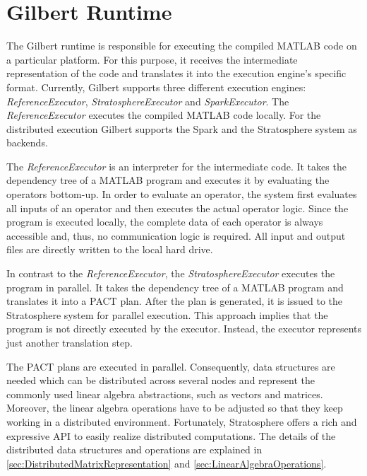 \section{Gilbert Runtime}
\label{cha:gilbertruntime}

The Gilbert runtime is responsible for executing the compiled MATLAB code on a particular platform.
For this purpose, it receives the intermediate representation of the code and translates it into the execution engine's specific format.
Currently, Gilbert supports three different execution engines: \emph{ReferenceExecutor}, \emph{StratosphereExecutor} and \emph{SparkExecutor}.
The \emph{ReferenceExecutor} executes the compiled MATLAB code locally.
For the distributed execution Gilbert supports the Spark and the Stratosphere system as backends.

The \emph{ReferenceExecutor} is an interpreter for the intermediate code.
It takes the dependency tree of a MATLAB program and executes it by evaluating the operators bottom-up.
In order to evaluate an operator, the system first evaluates all inputs of an operator and then executes the actual operator logic.
Since the program is executed locally, the complete data of each operator is always accessible and, thus, no communication logic is required.
All input and output files are directly written to the local hard drive.

In contrast to the \emph{ReferenceExecutor}, the \emph{StratosphereExecutor} executes the program in parallel.
It takes the dependency tree of a MATLAB program and translates it into a PACT plan.
After the plan is generated, it is issued to the Stratosphere system for parallel execution.
This approach implies that the program is not directly executed by the executor.
Instead, the executor represents just another translation step.

The PACT plans are executed in parallel.
Consequently, data structures are needed which can be distributed across several nodes and represent the commonly used linear algebra abstractions, such as vectors and matrices.
Moreover, the linear algebra operations have to be adjusted so that they keep working in a distributed environment.
Fortunately, Stratosphere offers a rich and expressive API to easily realize distributed computations.
The details of the distributed data structures and operations are explained in \cref{sec:DistributedMatrixRepresentation} and \cref{sec:LinearAlgebraOperations}.

